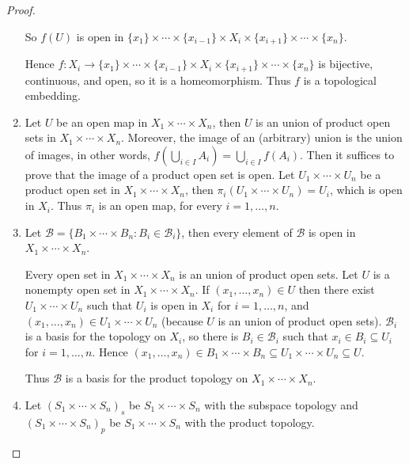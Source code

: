 \begin{proof}
\begin{enumerate}[label={(\alph*)}]
		      So $f(U)$ is open in $\{ x_{1} \} \times \cdots \times \{ x_{i-1} \} \times X_{i} \times \{ x_{i+1} \} \times \cdots \times \{ x_{n} \}$.

		      Hence $f: X_{i}\to \{ x_{1} \} \times \cdots \times \{ x_{i-1} \} \times X_{i} \times \{ x_{i+1} \} \times \cdots \times \{ x_{n} \}$ is bijective, continuous, and open, so it is a homeomorphism. Thus $f$ is a topological embedding.
		\item Let $U$ be an open map in $X_{1}\times\cdots\times X_{n}$, then $U$ is an union of product open sets in $X_{1}\times\cdots\times X_{n}$. Moreover, the image of an (arbitrary) union is the union of images, in other words, $f(\bigcup_{i\in I}A_{i}) = \bigcup_{i\in I}f(A_{i})$. Then it suffices to prove that the image of a product open set is open. Let $U_{1}\times\cdots \times U_{n}$ be a product open set in $X_{1}\times \cdots\times X_{n}$, then $\pi_{i}(U_{1}\times \cdots\times U_{n}) = U_{i}$, which is open in $X_{i}$. Thus $\pi_{i}$ is an open map, for every $i = 1,\ldots,n$.
		\item Let $\mathscr{B} = \{ B_{1}\times\cdots\times B_{n} : B_{i}\in\mathscr{B}_{i} \}$, then every element of $\mathscr{B}$ is open in $X_{1}\times \cdots \times X_{n}$.

		      Every open set in $X_{1}\times\cdots\times X_{n}$ is an union of product open sets. Let $U$ is a nonempty open set in $X_{1}\times\cdots\times X_{n}$. If $(x_{1}, \ldots, x_{n})\in U$ then there exist $U_{1}\times \cdots\times U_{n}$ such that $U_{i}$ is open in $X_{i}$ for $i = 1,\ldots,n$, and $(x_{1}, \ldots, x_{n})\in U_{1}\times\cdots\times U_{n}$ (because $U$ is an union of product open sets). $\mathscr{B}_{i}$ is a basis for the topology on $X_{i}$, so there is $B_{i}\in\mathscr{B}_{i}$ such that $x_{i}\in B_{i}\subseteq U_{i}$ for $i = 1,\ldots,n$. Hence $(x_{1}, \ldots, x_{n})\in B_{1}\times\cdots\times B_{n} \subseteq U_{1}\times\cdots\times U_{n} \subseteq U$.

		      Thus $\mathscr{B}$ is a basis for the product topology on $X_{1}\times\cdots\times X_{n}$.
		\item Let ${(S_{1}\times \cdots \times S_{n})}_{s}$ be $S_{1}\times \cdots \times S_{n}$ with the subspace topology and ${(S_{1}\times \cdots \times S_{n})}_{p}$ be $S_{1}\times\cdots\times S_{n}$ with the product topology.


\end{enumerate}
\end{proof}
